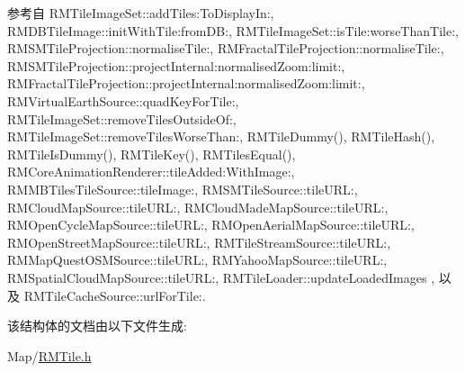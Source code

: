 参考自 R\-M\-Tile\-Image\-Set\-::add\-Tiles\-:\-To\-Display\-In\-:, R\-M\-D\-B\-Tile\-Image\-::init\-With\-Tile\-:from\-D\-B\-:, R\-M\-Tile\-Image\-Set\-::is\-Tile\-:worse\-Than\-Tile\-:, R\-M\-S\-M\-Tile\-Projection\-::normalise\-Tile\-:, R\-M\-Fractal\-Tile\-Projection\-::normalise\-Tile\-:, R\-M\-S\-M\-Tile\-Projection\-::project\-Internal\-:normalised\-Zoom\-:limit\-:, R\-M\-Fractal\-Tile\-Projection\-::project\-Internal\-:normalised\-Zoom\-:limit\-:, R\-M\-Virtual\-Earth\-Source\-::quad\-Key\-For\-Tile\-:, R\-M\-Tile\-Image\-Set\-::remove\-Tiles\-Outside\-Of\-:, R\-M\-Tile\-Image\-Set\-::remove\-Tiles\-Worse\-Than\-:, R\-M\-Tile\-Dummy(), R\-M\-Tile\-Hash(), R\-M\-Tile\-Is\-Dummy(), R\-M\-Tile\-Key(), R\-M\-Tiles\-Equal(), R\-M\-Core\-Animation\-Renderer\-::tile\-Added\-:\-With\-Image\-:, R\-M\-M\-B\-Tiles\-Tile\-Source\-::tile\-Image\-:, R\-M\-S\-M\-Tile\-Source\-::tile\-U\-R\-L\-:, R\-M\-Cloud\-Map\-Source\-::tile\-U\-R\-L\-:, R\-M\-Cloud\-Made\-Map\-Source\-::tile\-U\-R\-L\-:, R\-M\-Open\-Cycle\-Map\-Source\-::tile\-U\-R\-L\-:, R\-M\-Open\-Aerial\-Map\-Source\-::tile\-U\-R\-L\-:, R\-M\-Open\-Street\-Map\-Source\-::tile\-U\-R\-L\-:, R\-M\-Tile\-Stream\-Source\-::tile\-U\-R\-L\-:, R\-M\-Map\-Quest\-O\-S\-M\-Source\-::tile\-U\-R\-L\-:, R\-M\-Yahoo\-Map\-Source\-::tile\-U\-R\-L\-:, R\-M\-Spatial\-Cloud\-Map\-Source\-::tile\-U\-R\-L\-:, R\-M\-Tile\-Loader\-::update\-Loaded\-Images , 以及 R\-M\-Tile\-Cache\-Source\-::url\-For\-Tile\-:.



该结构体的文档由以下文件生成\-:\begin{DoxyCompactItemize}
\item 
Map/\hyperlink{_r_m_tile_8h}{R\-M\-Tile.\-h}\end{DoxyCompactItemize}
